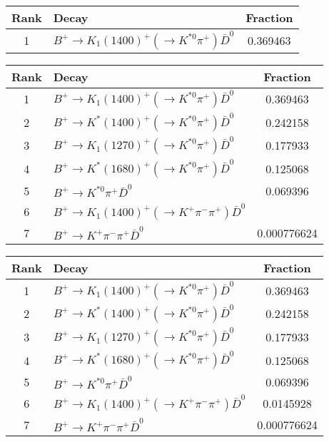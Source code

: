 \begin{table}
  \centering
  \begin{tabular}{clc}
      \toprule
      Rank & Decay & Fraction \\
      \midrule
      1 & $B^+ \to K_1(1400)^+ (\to K^{*0}\pi^+) \bar{D}^0$ & 0.369463 \\ 
      \bottomrule
  \end{tabular}
\end{table}
\begin{table}
  \centering
  \begin{tabular}{clc}
      \toprule
      Rank & Decay & Fraction \\
      \midrule
      1 & $B^+ \to K_1(1400)^+ (\to K^{*0}\pi^+) \bar{D}^0$ & 0.369463 \\ 
      2 & $B^+ \to K^*(1400)^+ (\to K^{*0}\pi^+) \bar{D}^0$ & 0.242158 \\ 
      3 & $B^+ \to K_1(1270)^+ (\to K^{*0}\pi^+) \bar{D}^0$ & 0.177933 \\ 
      4 & $B^+ \to K^*(1680)^+ (\to K^{*0}\pi^+) \bar{D}^0$ & 0.125068 \\ 
      5 & $B^+ \to K^{*0} \pi^+ \bar{D}^0$ & 0.069396 \\ 
      6 & $B^+ \to K_1(1400)^+ (\to K^+ \pi^- \pi^+) \bar{D}^0$ &  \\ 
      7 & $B^+ \to K^+ \pi^- \pi^+ \bar{D}^0$ & 0.000776624 \\ 
      \bottomrule
  \end{tabular}
\end{table}
\begin{table}
  \centering
  \begin{tabular}{clc}
      \toprule
      Rank & Decay & Fraction \\
      \midrule
      1 & $B^+ \to K_1(1400)^+ (\to K^{*0}\pi^+) \bar{D}^0$ & 0.369463 \\ 
      2 & $B^+ \to K^*(1400)^+ (\to K^{*0}\pi^+) \bar{D}^0$ & 0.242158 \\ 
      3 & $B^+ \to K_1(1270)^+ (\to K^{*0}\pi^+) \bar{D}^0$ & 0.177933 \\ 
      4 & $B^+ \to K^*(1680)^+ (\to K^{*0}\pi^+) \bar{D}^0$ & 0.125068 \\ 
      5 & $B^+ \to K^{*0} \pi^+ \bar{D}^0$ & 0.069396 \\ 
      6 & $B^+ \to K_1(1400)^+ (\to K^+ \pi^- \pi^+) \bar{D}^0$ & 0.0145928 \\ 
      7 & $B^+ \to K^+ \pi^- \pi^+ \bar{D}^0$ & 0.000776624 \\ 
      \bottomrule
  \end{tabular}
\end{table}
